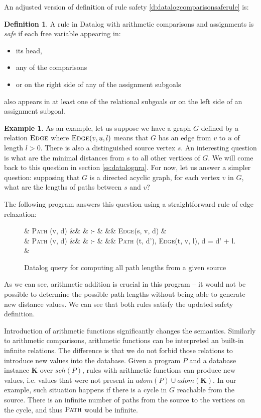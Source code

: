 \documentclass{pracamgr}
\theoremstyle{plain}
\theoremstyle{definition}
\newtheorem{defn}{Definition}[section]
\newtheorem{exmp}{Example}[section]
\theoremstyle{remark}
\newcommand{\narrow}[1]{\begin{changemargin}{2cm}{2cm} #1 \end{changemargin}}
\newcommand{\relat}[2]{$\textsc{#1}#2$}
\newcommand{\dprog}[4]{
  \begin{figure}[h!]
    \narrow{
      #1
      \begin{flalign*}
      #2
      \end{flalign*}
      \caption{#3}
      \label{#4}
    }
\end{figure}

}
\begin{document}
An adjusted version of definition of rule safety \ref{d:datalogcomparisonsaferule} is:

\begin{defn}
A rule in Datalog with arithmetic comparisons and assignments is \emph{safe} if each free variable appearing in:
\begin{itemize}
\item its head,
\item any of the comparisons 
\item or on the right side of any of the assignment subgoals
\end{itemize}
also appears in at least one of the relational subgoals or on the left side of an assignment subgoal.
\end{defn}\label{d:datalogeqsaferule}

\begin{exmp}

As an example, let us suppose we have a graph $G$ defined by a relation $\textsc{Edge}$ 
where \relat{Edge}{(v, u, l)} means that $G$ has an edge from $v$ to $u$ of length $l > 0$. 
There is also a distinguished source vertex $s$.
An interesting question is what are the minimal distances from $s$ to all other vertices of $G$.
We will come back to this question in section \ref{ss:datalognra}.
For now, let us answer a simpler question: supposing that $G$ is a directed acyclic graph, for each vertex $v$ in $G$,
what are the lengths of paths between $s$ and $v$?

The following program answers this question using a straightforward rule of edge relaxation:

\dprog{}{
  & \textsc{Path} (v, d) &&  & :- & && \textsc{Edge}(s, v, d) & \\
  & \textsc{Path} (v, d) &&  & :- & && \textsc{Path} (t, d'), \textsc{Edge}(t, v, l), d = d' + l. &\\
}{Datalog query for computing all path lengths from a given source}{ex:pathsdatalog}

As we can see, arithmetic addition is crucial in this program -- it would not be possible to determine the possible path lengths without being able to generate new distance values. We can see that both rules satisfy the updated safety definition.
\end{exmp}

Introduction of arithmetic functions significantly changes the semantics.
Similarly to arithmetic comparisons, arithmetic functions can be interpreted an built-in infinite relations. 
The difference is that we do not forbid those relations to introduce new values into the database.
Given a program $P$ and a database instance $\textbf{K}$ over $sch(P)$, rules with arithmetic functions can produce new values, i.e. values that were not present in $adom(P) \cup adom(\textbf{K})$. In our example, such situation happens if there is a cycle in $G$ reachable from the source. There is an infinite number of paths from the source to the vertices on the cycle, and thus $\textsc{Path}$ would be infinite.
\end{document}
